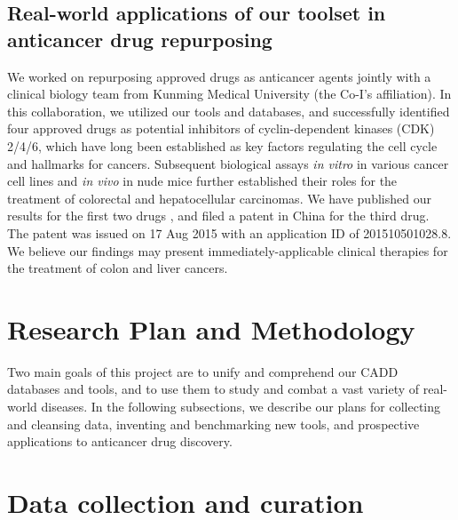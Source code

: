 \documentclass[a4paper,12pt]{article}
\begin{document}
\subsection*{Real-world applications of our toolset in anticancer drug repurposing}

We worked on repurposing approved drugs as anticancer agents jointly with a clinical biology team from Kunming Medical University (the Co-I's affiliation). In this collaboration, we utilized our tools and databases, and successfully identified four approved drugs as potential inhibitors of cyclin-dependent kinases (CDK) 2/4/6, which have long been established as key factors regulating the cell cycle and hallmarks for cancers. Subsequent biological assays \textit{in vitro} in various cancer cell lines and \textit{in vivo} in nude mice further established their roles for the treatment of colorectal \citep{1667} and hepatocellular \citep{1681} carcinomas. We have published our results for the first two drugs \citep{1667,1681}, and filed a patent in China for the third drug. The patent was issued on 17 Aug 2015 with an application ID of 201510501028.8. We believe our findings may present immediately-applicable clinical therapies for the treatment of colon and liver cancers.

\section*{Research Plan and Methodology}

Two main goals of this project are to unify and comprehend our CADD databases and tools, and to use them to study and combat a vast variety of real-world diseases. In the following subsections, we describe our plans for collecting and cleansing data, inventing and benchmarking new tools, and prospective applications to anticancer drug discovery.

\section*{Data collection and curation}

\end{document}
